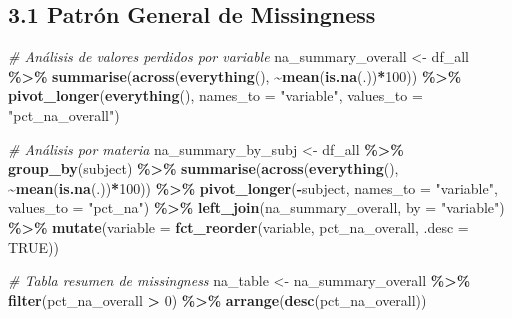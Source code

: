 \documentclass[
]{book}
\newenvironment{Shaded}{\begin{snugshade}}{\end{snugshade}}
\newcommand{\AttributeTok}[1]{\textcolor[rgb]{0.13,0.29,0.53}{#1}}
\newcommand{\CommentTok}[1]{\textcolor[rgb]{0.56,0.35,0.01}{\textit{#1}}}
\newcommand{\ConstantTok}[1]{\textcolor[rgb]{0.56,0.35,0.01}{#1}}
\newcommand{\DecValTok}[1]{\textcolor[rgb]{0.00,0.00,0.81}{#1}}
\newcommand{\FunctionTok}[1]{\textcolor[rgb]{0.13,0.29,0.53}{\textbf{#1}}}
\newcommand{\NormalTok}[1]{#1}
\newcommand{\OtherTok}[1]{\textcolor[rgb]{0.56,0.35,0.01}{#1}}
\newcommand{\SpecialCharTok}[1]{\textcolor[rgb]{0.81,0.36,0.00}{\textbf{#1}}}
\newcommand{\StringTok}[1]{\textcolor[rgb]{0.31,0.60,0.02}{#1}}
\begin{document}
\subsection{3.1 Patrón General de Missingness}\label{patruxf3n-general-de-missingness}

\begin{Shaded}
\begin{Highlighting}[]
\CommentTok{\# Análisis de valores perdidos por variable}
\NormalTok{na\_summary\_overall }\OtherTok{\textless{}{-}}\NormalTok{ df\_all }\SpecialCharTok{\%\textgreater{}\%}
  \FunctionTok{summarise}\NormalTok{(}\FunctionTok{across}\NormalTok{(}\FunctionTok{everything}\NormalTok{(), }\SpecialCharTok{\textasciitilde{}}\FunctionTok{mean}\NormalTok{(}\FunctionTok{is.na}\NormalTok{(.))}\SpecialCharTok{*}\DecValTok{100}\NormalTok{)) }\SpecialCharTok{\%\textgreater{}\%}
  \FunctionTok{pivot\_longer}\NormalTok{(}\FunctionTok{everything}\NormalTok{(), }\AttributeTok{names\_to =} \StringTok{"variable"}\NormalTok{, }\AttributeTok{values\_to =} \StringTok{"pct\_na\_overall"}\NormalTok{)}

\CommentTok{\# Análisis por materia}
\NormalTok{na\_summary\_by\_subj }\OtherTok{\textless{}{-}}\NormalTok{ df\_all }\SpecialCharTok{\%\textgreater{}\%}
  \FunctionTok{group\_by}\NormalTok{(subject) }\SpecialCharTok{\%\textgreater{}\%}
  \FunctionTok{summarise}\NormalTok{(}\FunctionTok{across}\NormalTok{(}\FunctionTok{everything}\NormalTok{(), }\SpecialCharTok{\textasciitilde{}}\FunctionTok{mean}\NormalTok{(}\FunctionTok{is.na}\NormalTok{(.))}\SpecialCharTok{*}\DecValTok{100}\NormalTok{)) }\SpecialCharTok{\%\textgreater{}\%}
  \FunctionTok{pivot\_longer}\NormalTok{(}\SpecialCharTok{{-}}\NormalTok{subject, }\AttributeTok{names\_to =} \StringTok{"variable"}\NormalTok{, }\AttributeTok{values\_to =} \StringTok{"pct\_na"}\NormalTok{) }\SpecialCharTok{\%\textgreater{}\%}
  \FunctionTok{left\_join}\NormalTok{(na\_summary\_overall, }\AttributeTok{by =} \StringTok{"variable"}\NormalTok{) }\SpecialCharTok{\%\textgreater{}\%}
  \FunctionTok{mutate}\NormalTok{(}\AttributeTok{variable =} \FunctionTok{fct\_reorder}\NormalTok{(variable, pct\_na\_overall, }\AttributeTok{.desc =} \ConstantTok{TRUE}\NormalTok{))}

\CommentTok{\# Tabla resumen de missingness}
\NormalTok{na\_table }\OtherTok{\textless{}{-}}\NormalTok{ na\_summary\_overall }\SpecialCharTok{\%\textgreater{}\%}
  \FunctionTok{filter}\NormalTok{(pct\_na\_overall }\SpecialCharTok{\textgreater{}} \DecValTok{0}\NormalTok{) }\SpecialCharTok{\%\textgreater{}\%}
  \FunctionTok{arrange}\NormalTok{(}\FunctionTok{desc}\NormalTok{(pct\_na\_overall))}


\end{Highlighting}
\end{Shaded}
\end{document}
